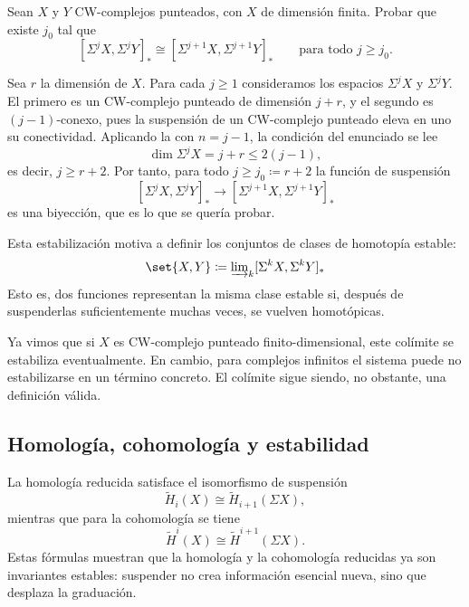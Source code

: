 \begin{ejer}\label{ejer:biysus}
Sean $X$ y $Y$ CW-complejos punteados, con $X$ de dimensión finita. Probar que existe $j_0$ tal que
\[
[\Sigma^jX,\Sigma^jY]_*\cong[\Sigma^{j+1}X,\Sigma^{j+1}Y]_*\qquad\text{para todo }j\ge j_0.
\]
\end{ejer}

\begin{sol}
Sea $r$ la dimensión de $X$. Para cada $j\ge1$ consideramos los espacios $\Sigma^jX$ y $\Sigma^jY$. El primero es un CW-complejo punteado de dimensión $j+r$, y el segundo es $(j-1)$-conexo, pues la suspensión de un CW-complejo punteado eleva en uno su conectividad. Aplicando la  con $n=j-1$, la condición del enunciado se lee
\[
\dim\Sigma^jX=j+r\le 2(j-1),
\]
es decir, $j\ge r+2$. Por tanto, para todo $j\ge j_0\coloneqq r+2$ la función de suspensión
\[
[\Sigma^jX,\Sigma^jY]_*\longrightarrow[\Sigma^{j+1}X,\Sigma^{j+1}Y]_*
\]
es una biyección, que es lo que se quería probar.
\end{sol}

Esta estabilización motiva a definir los conjuntos de clases de homotopía estable:
\[
\set{X,Y}\coloneqq \varinjlim\nolimits_k [\Sigma^kX,\Sigma^kY]_*
\]
Esto es, dos funciones representan la misma clase estable si, después de suspenderlas suficientemente muchas veces, se vuelven homotópicas.

Ya vimos que si \(X\) es CW-complejo punteado finito-dimensional, este colímite se estabiliza eventualmente.
En cambio, para complejos infinitos el sistema puede no estabilizarse en un término concreto. El colímite sigue siendo, no obstante, una definición válida.

\subsection{Homología, cohomología y estabilidad}

La homología reducida satisface el isomorfismo de suspensión
\[
\widetilde H_i(X)\cong\widetilde H_{i+1}(\Sigma X),
\]
mientras que para la cohomología se tiene
\[
\widetilde H^i(X)\cong\widetilde H^{i+1}(\Sigma X).
\]
Estas fórmulas muestran que la homología y la cohomología reducidas ya son invariantes estables: suspender no crea información esencial nueva, sino que desplaza la graduación.

